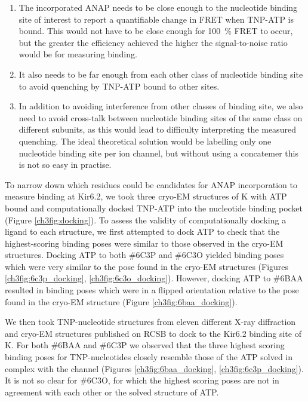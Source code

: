 \begin{enumerate}
	\item The incorporated ANAP needs to be close enough to the nucleotide binding site of interest to report a quantifiable change in FRET when TNP-ATP is bound.
	This would not have to be close enough for \SI{100}{\percent} FRET to occur, but the greater the efficiency achieved the higher the signal-to-noise ratio would be for measuring binding.
	\item It also needs to be far enough from each other class of nucleotide binding site to avoid quenching by TNP-ATP bound to other sites.
	\item In addition to avoiding interference from other classes of binding site, we also need to avoid cross-talk between nucleotide binding sites of the same class on different subunits, as this would lead to difficulty interpreting the measured quenching.
	The ideal theoretical solution would be labelling only one nucleotide binding site per ion channel, but without using a concatemer this is not so easy in practise.
\end{enumerate}

To narrow down which residues could be candidates for ANAP incorporation to measure binding at Kir6.2, we took three cryo-EM structures of K\ATP{} with ATP bound and computationally docked TNP-ATP into the nucleotide binding pocket (Figure \ref{ch3fig:docking}).
To assess the validity of computationally docking a ligand to each structure, we first attempted to dock ATP to check that the highest-scoring binding poses were similar to those observed in the cryo-EM structures.
Docking ATP to both \#6C3P and \#6C3O yielded binding poses which were very similar to the pose found in the cryo-EM structures (Figures \ref{ch3fig:6c3p_docking}, \ref{ch3fig:6c3o_docking}).
However, docking ATP to \#6BAA resulted in binding poses which were in a flipped orientation relative to the pose found in the cryo-EM structure (Figure \ref{ch3fig:6baa_docking}).

We then took TNP-nucleotide structures from eleven different X-ray diffraction and cryo-EM structures published on RCSB to dock to the Kir6.2 binding site of K\ATP{}.
For both \#6BAA and \#6C3P we observed that the three highest scoring binding poses for TNP-nucleotides closely resemble those of the ATP solved in complex with the channel (Figures \ref{ch3fig:6baa_docking}, \ref{ch3fig:6c3p_docking}).
It is not so clear for \#6C3O, for which the highest scoring poses are not in agreement with each other or the solved structure of ATP.


